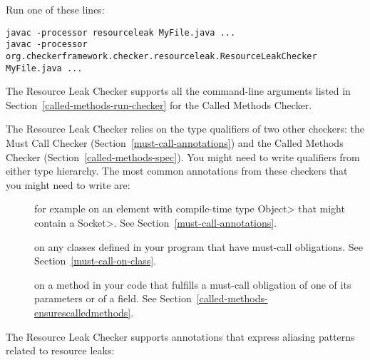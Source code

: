 
Run one of these lines:

\begin{Verbatim}
javac -processor resourceleak MyFile.java ...
javac -processor org.checkerframework.checker.resourceleak.ResourceLeakChecker MyFile.java ...
\end{Verbatim}

The Resource Leak Checker supports all the command-line arguments
 listed in Section~\ref{called-methods-run-checker} for
the Called Methods Checker.


The Resource Leak Checker relies on the type qualifiers of two other checkers:
the Must Call Checker (Section~\ref{must-call-annotations}) and
the Called Methods Checker (Section~\ref{called-methods-spec}). You might need
to write qualifiers from either type hierarchy. The most common annotations from
these checkers that you might need to write are:

\begin{description}

\item[]
for example on an element with compile-time type \<Object> that might contain a \<Socket>.
See Section~\ref{must-call-annotations}.

\item[]
on any classes defined in your program that have must-call obligations. See Section~\ref{must-call-on-class}.

\item[] on a method in
your code that fulfills a must-call obligation of one of its parameters or of a field.
See Section~\ref{called-methods-ensurescalledmethods}.

\end{description}

The Resource Leak Checker supports annotations that express
aliasing patterns related to resource leaks:

